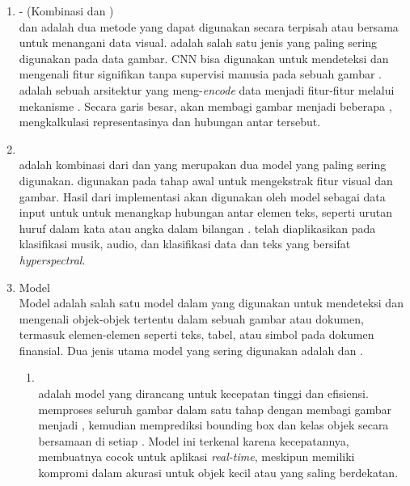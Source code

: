 \begin{enumerate}
	\item \cnn\--\transformer{} (Kombinasi \cnn{} dan \transformer)~\\
	      \cnn{} dan \transformer{} adalah dua metode yang dapat digunakan secara terpisah atau bersama untuk menangani data visual. \cnn{} adalah salah satu jenis \MakeLowercase{{\nn{}}} yang paling sering digunakan pada data gambar. CNN bisa digunakan untuk mendeteksi dan mengenali fitur signifikan tanpa supervisi manusia pada sebuah gambar \parencite{alzubaidi2021review}. \transformer{} adalah sebuah arsitektur \MakeLowercase{\nn{}} yang meng-\emph{encode} data menjadi fitur-fitur melalui mekanisme \attention. Secara garis besar, \transformer{} akan membagi gambar menjadi beberapa \patch{}, mengkalkulasi representasinya dan hubungan antar \patch{} tersebut. \parencite{han2021transformer}
	\item \crnnfull~\\
	      \crnn{} adalah kombinasi dari \cnn{} dan \rnn{} yang merupakan dua model yang paling sering digunakan. \cnn{} digunakan pada tahap awal untuk mengekstrak fitur visual dan gambar. Hasil dari implementasi \cnn{} akan digunakan oleh model \rnn{} sebagai data input untuk untuk menangkap hubungan antar elemen teks, seperti urutan huruf dalam kata atau angka dalam bilangan \parencite{wang2019convolutional}. \crnn{} telah diaplikasikan pada klasifikasi musik, audio, dan klasifikasi data dan teks yang bersifat \emph{hyperspectral}.
	\item Model \objectdetection~\\
	      Model \objectdetection{} adalah salah satu model dalam \dl{} yang digunakan untuk mendeteksi dan mengenali objek-objek tertentu dalam sebuah gambar atau dokumen, termasuk elemen-elemen seperti teks, tabel, atau simbol pada dokumen finansial. Dua jenis utama model \objectdetection{} yang sering digunakan adalah \yolofull{} dan \rcnnfull{}.
	      \begin{enumerate}
		      \item \yolo~\\
		            \yolo{} adalah model \objectdetection{} yang dirancang untuk kecepatan tinggi dan efisiensi. \yolo{} memproses seluruh gambar dalam satu tahap dengan membagi gambar menjadi \grid{}, kemudian memprediksi bounding box dan kelas objek secara bersamaan di setiap \grid{} \parencite{diwan2023object}. Model ini terkenal karena kecepatannya, membuatnya cocok untuk aplikasi \emph{real-time}, meskipun memiliki  kompromi dalam akurasi untuk objek kecil atau yang saling berdekatan.

\end{enumerate}
\end{enumerate}
